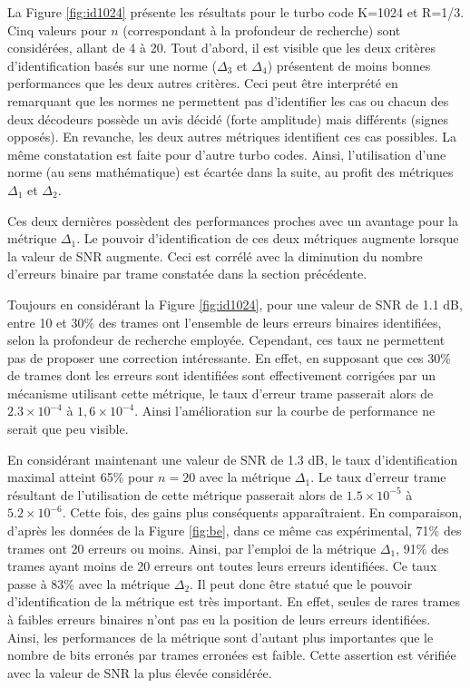 La Figure \ref{fig:id1024} présente les résultats pour le turbo code K=1024 et R=1/3. Cinq valeurs pour $n$ 
(correspondant à la profondeur de recherche) sont considérées, allant de 4 à 20. Tout d'abord, il est visible que 
les deux critères d'identification basés sur une norme ($\Delta_3$ et $\Delta_4$) présentent de moins bonnes performances
que les deux autres critères. Ceci peut être interprété en remarquant que les normes ne permettent pas d'identifier les
cas ou chacun des deux décodeurs possède un avis décidé (forte amplitude) mais différents (signes opposés). En revanche, 
les deux autres métriques identifient ces cas possibles. La même constatation est faite pour d'autre turbo codes. Ainsi, 
l'utilisation d'une norme (au sens mathématique) est écartée dans la suite, au profit des métriques $\Delta_1$ et $\Delta_2$.

Ces deux dernières possèdent des performances proches avec un avantage pour la métrique $\Delta_1$. Le pouvoir 
d'identification de ces deux métriques augmente lorsque la valeur de SNR augmente. Ceci est corrélé avec la diminution du 
nombre d'erreurs binaire par trame constatée dans la section précédente.

Toujours en considérant la Figure \ref{fig:id1024}, pour une valeur de SNR de 1.1 dB, entre 10 et 30\% des trames ont 
l'ensemble de leurs erreurs binaires identifiées, selon la profondeur de recherche employée. Cependant, ces taux ne 
permettent pas de proposer une correction intéressante. En effet, en supposant que ces 30\% de trames dont les erreurs sont 
identifiées sont effectivement corrigées par un mécanisme utilisant cette métrique, le taux d'erreur trame passerait alors 
de $2.3\times 10^{-4}$ à $1,6\times 10^{-4}$. Ainsi l'amélioration sur la courbe de performance ne serait que peu visible.

En considérant maintenant une valeur de SNR de 1.3 dB, le taux d'identification maximal atteint 65\% pour $n=20$ avec la 
métrique $\Delta_1$. Le taux d'erreur trame résultant de l'utilisation de cette métrique passerait alors de 
$1.5\times 10^{-5}$ à $5.2\times 10^{-6}$. Cette fois, des gains plus conséquents apparaîtraient. En comparaison, 
d'après les données de la Figure \ref{fig:be}, dans ce même cas expérimental, 71\% des trames ont 20 erreurs ou moins. 
Ainsi, par l'emploi de la métrique $\Delta_1$, 91\% des trames ayant moins de 20 erreurs ont toutes leurs erreurs 
identifiées. Ce taux passe à 83\% avec la métrique $\Delta_2$. Il peut donc être statué que le pouvoir d'identification 
de la métrique est très important. En effet, seules de rares trames à faibles erreurs binaires n'ont pas eu la position 
de leurs erreurs identifiées. Ainsi, les performances de la métrique sont d'autant plus importantes que le nombre de bits
erronés par trames erronées est faible. Cette assertion est vérifiée avec la valeur de SNR la plus élevée considérée.

